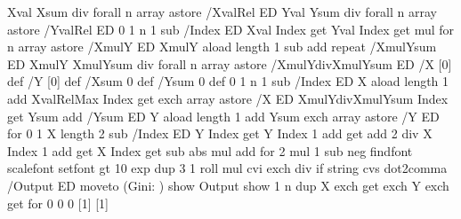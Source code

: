 {{{  Xval { Xsum div } forall n array astore /XvalRel ED 
  Yval { Ysum div } forall n array astore /YvalRel ED 
  0 1 n 1 sub { 
    /Index ED
    Xval Index get 
    Yval Index get
    mul } for
  n array astore /XmulY ED
  XmulY aload length 1 sub { add } repeat 
  /XmulYsum ED
  XmulY { XmulYsum div } forall 
  n array astore /XmulYdivXmulYsum ED
  /X [0] def
  /Y [0] def
  /Xsum 0 def /Ysum 0 def
  0 1 n 1 sub {
    /Index ED 
    X aload length 1 add XvalRelMax Index get exch array astore /X ED %
    XmulYdivXmulYsum Index get Ysum add /Ysum ED
    Y aload length 1 add Ysum exch array astore /Y ED
  } for
  0 1 X length 2 sub { 
    /Index ED
    Y Index get Y Index 1 add get add 2 div %
    X Index 1 add get X Index get sub abs   %
    mul %
    add
  } for
  2 mul 1 sub neg %
  \psk@PSfont findfont \psk@fontscale scalefont setfont 
   gt { 10 \psk@decimals exp dup 3 1 roll mul cvi exch div } if
  \psk@valuewidth string cvs %
  \ifPst@comma dot2comma \fi      %
  /Output ED
  \psk@xShift{} moveto (Gini: ) show 
  Output show 
   1 n { dup X exch get exch Y exch get } for 
   0 0 0 \fi                   %
  }%
  \if@star\listplot*{\Lorenz@code}\else\listplot{\Lorenz@code}%
  \fi%
}\ignorespaces}
%
[1]{\pst@radiusA}
[1]{\pst@radiusB}
%
\def\psLame{\pst@object{psLame}}
\def\psLame@i#1{%
  \leavevmode
  \pst@killglue
  \begingroup
  \addbefore@par{plotpoints=200}%
  \use@par
  \parametricplot{0}{360}{%
     t cos dup mul 1 #1\space div exp \pst@radiusA \pst@number\psxunit div mul 
     t 90 gt { t 270 lt { neg } if } if
     t sin dup mul 1 #1\space div exp \pst@radiusB \pst@number\psyunit div mul 
     t 180 gt { neg } if }
  \endgroup\ignorespaces}
%
%
